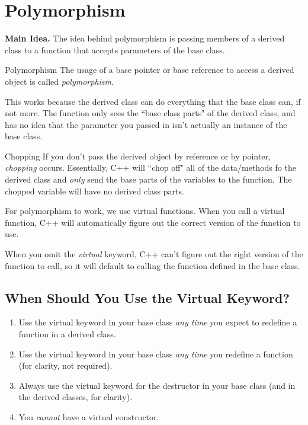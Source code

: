 \documentclass[class=article, crop=false]{standalone}
\begin{document}
  \section{Polymorphism}
  \textbf{Main Idea.} The idea behind polymorphism is passing members of a derived class to a function that accepts parameters of the base class.
  \begin{definition}{Polymorphism}
    The usage of a base pointer or base reference to access a derived object is called \emph{polymorphism}.
  \end{definition}
  This works because the derived class can do everything that the base class can, if not more. The function only sees the ``base class parts" of the derived class, and has no idea that the parameter you passed in isn't actually an instance of the base class.
  \begin{definition}{Chopping}
    If you don't pass the derived object by reference or by pointer, \emph{chopping} occurs. Essentially, C++ will ``chop off" all of the data/methods fo the derived class and \emph{only} send the base parts of the variables to the function. The chopped variable will have no derived class parts.
  \end{definition}
  For polymorphism to work, we use virtual functions. When you call a virtual function, C++ will automatically figure out the correct version of the function to use.
  \begin{note}{}
    When you omit the \emph{virtual} keyword, C++ can't figure out the right version of the function to call, so it will default to calling the function defined in the base class.
  \end{note}
  \subsection{When Should You Use the Virtual Keyword?}
  \begin{enumerate}
    \item Use the virtual keyword in your base class \emph{any time} you expect to redefine a function in a derived class.
    \item Use the virtual keyword in your base class \emph{any time} you redefine a function (for clarity, not required).
    \item Always use the virtual keyword for the destructor in your base class (and in the derived classes, for clarity).
    \item You \emph{cannot} have a virtual constructor.
  \end{enumerate}
\end{document}
